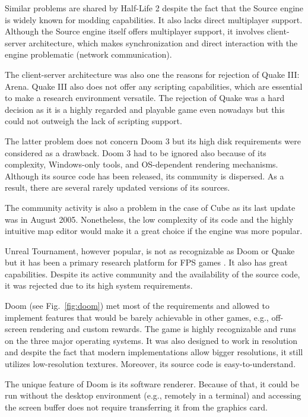 \documentclass[english,american,conference, balance]{IEEEtran}
\begin{document}
Similar problems are shared by Half-Life 2 despite the fact that the
Source engine is widely known for modding capabilities. It also lacks
direct multiplayer support. Although the Source engine itself offers
multiplayer support, it involves client-server architecture, which
makes synchronization and direct interaction with the engine problematic
(network communication).

The client-server
architecture was also one the reasons for rejection of Quake III:
Arena. Quake III also does not offer any scripting capabilities, which
are essential to make a research environment versatile. The rejection
of Quake was a hard decision as it is a highly regarded and playable
game even nowadays but this could not outweigh the lack of scripting
support.

The latter problem does not concern Doom 3 but its high disk requirements
were considered as a drawback. Doom 3 had to be ignored also because
of its complexity, Windows-only tools, and OS-dependent rendering
mechanisms. Although its source code has been released, its community
is dispersed. As a result, there are several rarely updated versions
of its sources.

The community activity is also a problem in the case of Cube as its
last update was in August 2005. Nonetheless, the low complexity of
its code and the highly intuitive map editor would make it a great
choice if the engine was more popular.

Unreal Tournament, however popular, is not as recognizable as Doom
or Quake but it has been a primary research platform for FPS games
\cite{5586059,6046867}. It also has great capabilities. Despite its
active community and the availability of the source code, it was rejected
due to its high system requirements.

Doom (see Fig.~\ref{fig:doom}) met most of the requirements and
allowed to implement features that would be barely achievable in other
games, e.g., off-screen rendering and custom rewards. The game is
highly recognizable and runs on the three major operating systems.
It was also designed to work in  resolution and despite
the fact that modern implementations allow bigger resolutions, it
still utilizes low-resolution textures. Moreover, its source code
is easy-to-understand.

The unique feature of Doom is its software renderer. Because of that,
it could be run without the desktop environment (e.g., remotely in
a terminal) and accessing the screen buffer does not require transferring
it from the graphics card.
\end{document}
